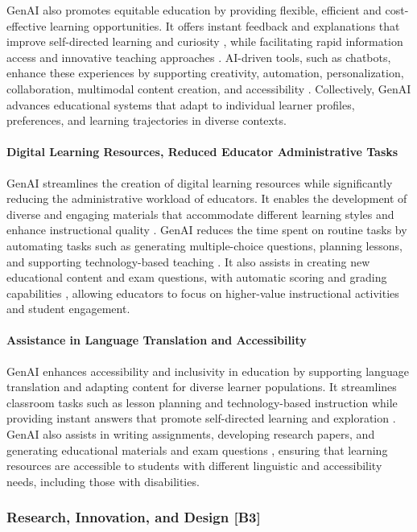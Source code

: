 GenAI also promotes equitable education by providing flexible, efficient and cost-effective learning opportunities. It offers instant feedback and explanations that improve self-directed learning and curiosity \parencite{S12}, while facilitating rapid information access and innovative teaching approaches \parencite{S14}. AI-driven tools, such as chatbots, enhance these experiences by supporting creativity, automation, personalization, collaboration, multimodal content creation, and accessibility \parencite{S15,S18}. Collectively, GenAI advances educational systems that adapt to individual learner profiles, preferences, and learning trajectories in diverse contexts.

\paragraph{Digital Learning Resources, Reduced Educator Administrative Tasks}
GenAI streamlines the creation of digital learning resources while significantly reducing the administrative workload of educators. It enables the development of diverse and engaging materials that accommodate different learning styles and enhance instructional quality \parencite{S12}. GenAI reduces the time spent on routine tasks by automating tasks such as generating multiple-choice questions, planning lessons, and supporting technology-based teaching \parencite{S12}. It also assists in creating new educational content and exam questions, with automatic scoring and grading capabilities \parencite{S14}, allowing educators to focus on higher-value instructional activities and student engagement.

\paragraph{Assistance in Language Translation and Accessibility}
GenAI enhances accessibility and inclusivity in education by supporting language translation and adapting content for diverse learner populations. It streamlines classroom tasks such as lesson planning and technology-based instruction while providing instant answers that promote self-directed learning and exploration \parencite{S12}. GenAI also assists in writing assignments, developing research papers, and generating educational materials and exam questions \parencite{S14}, ensuring that learning resources are accessible to students with different linguistic and accessibility needs, including those with disabilities.

\subsubsection{Research, Innovation, and Design [B3]}
